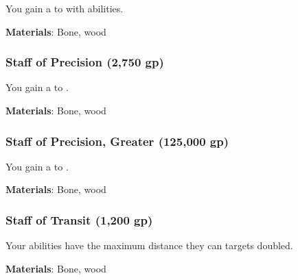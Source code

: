 You gain a   to  with  abilities.



\vspace{0.25em}
\textbf{Materials}: Bone, wood


\lowercase{\hypertarget{item:Staff of Precision}{}}\label{item:Staff of Precision}
\hypertarget{item:Staff of Precision}{\subsubsection{Staff of Precision\hfill{} (2,750 gp)}}

You gain a   to .



\vspace{0.25em}
\textbf{Materials}: Bone, wood


\lowercase{\hypertarget{item:Staff of Precision, Greater}{}}\label{item:Staff of Precision, Greater}
\hypertarget{item:Staff of Precision, Greater}{\subsubsection{Staff of Precision, Greater\hfill{} (125,000 gp)}}

You gain a   to .



\vspace{0.25em}
\textbf{Materials}: Bone, wood


\lowercase{\hypertarget{item:Staff of Transit}{}}\label{item:Staff of Transit}
\hypertarget{item:Staff of Transit}{\subsubsection{Staff of Transit\hfill{} (1,200 gp)}}

Your  abilities have the maximum distance they can  targets doubled.



\vspace{0.25em}
\textbf{Materials}: Bone, wood
